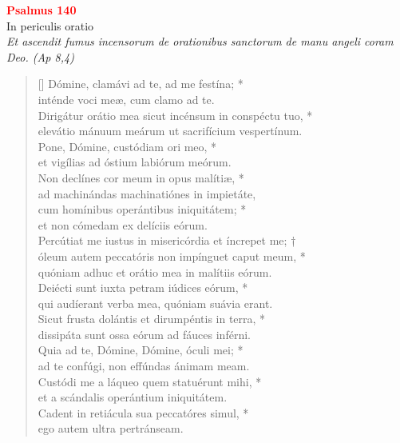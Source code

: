 


\def\greinitialformat#1{%
{\fontsize{39}{39}\selectfont #1}%
}




\vspace{0.3cm}
\begin{center}
 \textcolor{red}{\large \bf Psalmus 140}\\
In periculis oratio\\
\textit{\small Et ascendit fumus incensorum de orationibus sanctorum de manu angeli coram Deo. (Ap 8,4)}
\end{center}
\begin{verse}[\versewidth]
Dómine, clamávi ad te, ad me festína; *\\
inténde voci meæ, cum clamo ad te.\\
\vin Dirigátur orátio mea sicut incénsum in conspéctu tuo, *\\
\vin elevátio mánuum meárum ut sacrifícium vespertínum.\\
Pone, Dómine, custódiam ori meo, *\\
et vigílias ad óstium labiórum meórum.\\
\vin Non declínes cor meum in opus malítiæ, *\\
\vin ad machinándas machinatiónes in impietáte,\\
cum homínibus operántibus iniquitátem; *\\
et non cómedam ex delíciis eórum.\\
\vin Percútiat me iustus in misericórdia et íncrepet me; †\\
\vin óleum autem peccatóris non impínguet caput meum, *\\
\vin quóniam adhuc et orátio mea in malítiis eórum.\\
Deiécti sunt iuxta petram iúdices eórum, *\\
qui audíerant verba mea, quóniam suávia erant.\\
\vin Sicut frusta dolántis et dirumpéntis in terra, *\\
\vin dissipáta sunt ossa eórum ad fáuces inférni.\\
Quia ad te, Dómine, Dómine, óculi mei; *\\
ad te confúgi, non effúndas ánimam meam.\\
\vin Custódi me a láqueo quem statuérunt mihi, *\\
\vin et a scándalis operántium iniquitátem.\\
Cadent in retiácula sua peccatóres simul, *\\
ego autem ultra pertránseam.\\
\end{verse}
\vspace{1cm}


